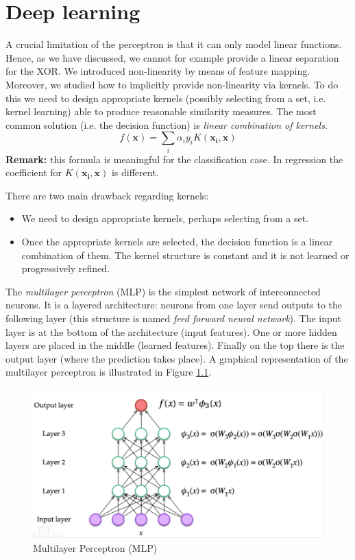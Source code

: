 \chapter{Deep learning}
\label{cha:deep_learning}
A crucial limitation of the perceptron is that it can only model linear functions. Hence, as we have discussed, we cannot for example provide a linear separation for the XOR. We introduced non-linearity by means of feature mapping. Moreover, we studied how to implicitly provide non-linearity via kernels. To do this we need to design appropriate kernels (possibly selecting from a set, i.e. kernel learning) able to produce reasonable similarity measures. The most common solution (i.e. the decision function) is \textit{linear combination of kernels}.
$$f(\pmb{x}) = \sum_i \alpha_i y_i K(\pmb{x_i}, \pmb{x})$$
\textbf{Remark:} this formula is meaningful for the classification case. In regression the coefficient for $K(\pmb{x_i}, \pmb{x})$ is different. \newline

There are two main drawback regarding kernels:
\begin{itemize}
    \item We need to design appropriate kernels, perhaps selecting from a set.
    \item Once the appropriate kernels are selected, the decision function is a linear combination of them. The kernel structure is constant and it is not learned or progressively refined.
\end{itemize}

The \textit{multilayer perceptron} (MLP) is the simplest network of interconnected neurons.  It is a layered architecture: neurons from one layer send outputs to the following layer (this structure is named \textit{feed forward neural network}). The input layer is at the bottom of the architecture (input features). One or more hidden layers are placed in the middle (learned features). Finally on the top there is the output layer (where the prediction takes place). A graphical representation of the multilayer perceptron is illustrated in Figure \ref{fig:mlp}. \newline

\begin{figure}
    \centering
    \includegraphics[width=\textwidth]{images/mlp.png}
    \caption{Multilayer Perceptron (MLP)}
    \label{fig:mlp}
\end{figure}

